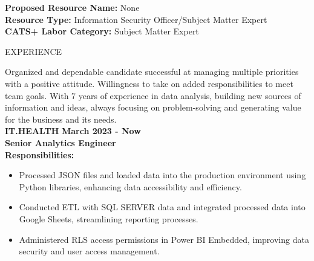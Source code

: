 \documentclass{resume} %
\begin{document}
\begin{flushleft}
    \textbf{Proposed Resource Name:} None \\
    \textbf{Resource Type:} Information Security Officer/Subject Matter Expert \\
    \textbf{CATS+ Labor Category:} Subject Matter Expert
\end{flushleft}

\vspace{1.3em}

\begin{rSection}{EXPERIENCE}
        \begin{flushleft}
        Organized and dependable candidate successful at managing multiple priorities with a positive attitude. Willingness to take on added responsibilities to meet team goals. With 7 years of experience in data analysis, building new sources of information and ideas, always focusing on problem{-}solving and generating value for the business and its needs. \\
        \vspace{1em} 
            \textbf{IT.HEALTH} \hfill \textbf{March 2023 {-} Now} \\
            \textbf{Senior Analytics Engineer} \\
            \vspace{1em}
            \textbf{Responsibilities:} \\
            \begin{itemize}
                                    \item Processed JSON files and loaded data into the production environment using Python libraries, enhancing data accessibility and efficiency.
                                    \item Conducted ETL with SQL SERVER data and integrated processed data into Google Sheets, streamlining reporting processes.
                                    \item Administered RLS access permissions in Power BI Embedded, improving data security and user access management.
                            \end{itemize}
            \vspace{0.5em}

\end{flushleft}
\end{rSection}
\end{document}
